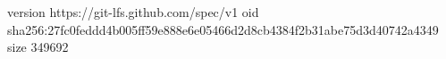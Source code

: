 version https://git-lfs.github.com/spec/v1
oid sha256:27fc0feddd4b005ff59e888e6e05466d2d8cb4384f2b31abe75d3d40742a4349
size 349692
